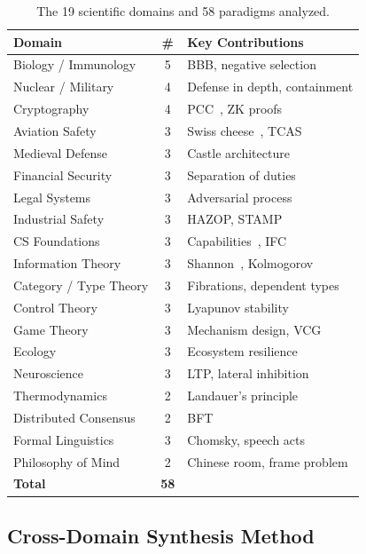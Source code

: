 \begin{table}[t]
\centering
\small
\caption{The 19 scientific domains and 58 paradigms analyzed.}
\label{tab:domains}
\begin{tabular}{@{}lcp{4.2cm}@{}}
\toprule
Domain & \# & Key Contributions \\
\midrule
Biology / Immunology   & 5 & BBB, negative selection \\
Nuclear / Military     & 4 & Defense in depth, containment \\
Cryptography           & 4 & PCC~\cite{necula1997}, ZK proofs \\
Aviation Safety        & 3 & Swiss cheese~\cite{reason1990}, TCAS \\
Medieval Defense       & 3 & Castle architecture \\
Financial Security     & 3 & Separation of duties \\
Legal Systems          & 3 & Adversarial process \\
Industrial Safety      & 3 & HAZOP, STAMP~\cite{leveson2004} \\
CS Foundations         & 3 & Capabilities~\cite{dennis1966}, IFC~\cite{denning1976} \\
Information Theory     & 3 & Shannon~\cite{shannon1948}, Kolmogorov \\
Category / Type Theory & 3 & Fibrations, dependent types \\
Control Theory         & 3 & Lyapunov stability \\
Game Theory            & 3 & Mechanism design, VCG \\
Ecology                & 3 & Ecosystem resilience \\
Neuroscience           & 3 & LTP, lateral inhibition \\
Thermodynamics         & 2 & Landauer's principle~\cite{landauer1961} \\
Distributed Consensus  & 2 & BFT~\cite{lamport1982} \\
Formal Linguistics     & 3 & Chomsky, speech acts~\cite{austin1962} \\
Philosophy of Mind     & 2 & Chinese room, frame problem \\
\midrule
\textbf{Total}         & \textbf{58} & \\
\bottomrule
\end{tabular}
\end{table}

\subsection{Cross-Domain Synthesis Method}

